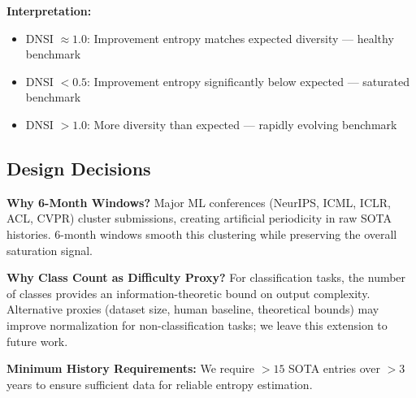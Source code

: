 \textbf{Interpretation:}
\begin{itemize}
    \item DNSI $\approx 1.0$: Improvement entropy matches expected diversity --- healthy benchmark
    \item DNSI $< 0.5$: Improvement entropy significantly below expected --- saturated benchmark
    \item DNSI $> 1.0$: More diversity than expected --- rapidly evolving benchmark
\end{itemize}

\subsection{Design Decisions}

\textbf{Why 6-Month Windows?} Major ML conferences (NeurIPS, ICML, ICLR, ACL, CVPR) cluster submissions, creating artificial periodicity in raw SOTA histories. 6-month windows smooth this clustering while preserving the overall saturation signal.

\textbf{Why Class Count as Difficulty Proxy?} For classification tasks, the number of classes provides an information-theoretic bound on output complexity. Alternative proxies (dataset size, human baseline, theoretical bounds) may improve normalization for non-classification tasks; we leave this extension to future work.

\textbf{Minimum History Requirements:} We require $>15$ SOTA entries over $>3$ years to ensure sufficient data for reliable entropy estimation.
